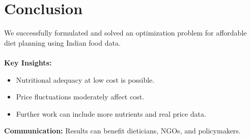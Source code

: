 \documentclass{article}
\begin{document}
\section*{Conclusion}
We successfully formulated and solved an optimization problem for affordable diet planning using Indian food data.\\
\\
\textbf{Key Insights:}
\begin{itemize}
    \item Nutritional adequacy at low cost is possible.
    \item Price fluctuations moderately affect cost.
    \item Further work can include more nutrients and real price data.
\end{itemize}

\textbf{Communication:} Results can benefit dieticians, NGOs, and policymakers.
\end{document}
